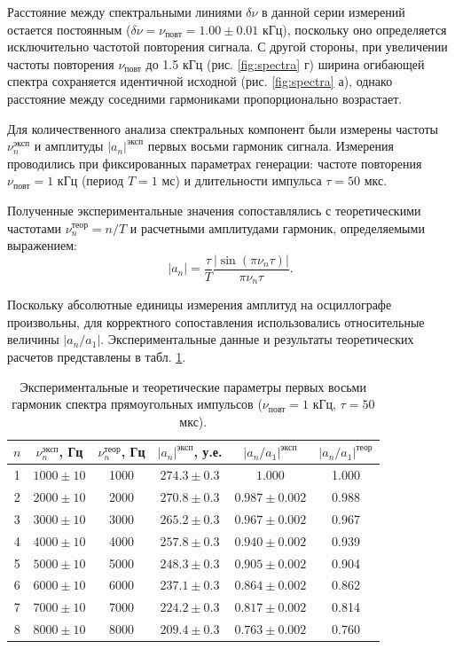 \documentclass[reprint, amsmath, amssymb, aps, pra, nofootinbib]{revtex4-2}
\begin{document}
Расстояние между спектральными линиями $\delta\nu$ в данной серии измерений остается постоянным ($\delta\nu = \nu_{\text{повт}} = 1.00 \pm 0.01$ кГц), поскольку оно определяется исключительно частотой повторения сигнала. С другой стороны, при увеличении частоты повторения $\nu_{\text{повт}}$ до 1.5 кГц (рис. \ref{fig:spectra} г) ширина огибающей спектра сохраняется идентичной исходной (рис. \ref{fig:spectra} а), однако расстояние между соседними гармониками пропорционально возрастает.

Для количественного анализа спектральных компонент были измерены частоты $\nu_n^{\text{эксп}}$ и амплитуды $|a_n|^{\text{эксп}}$ первых восьми гармоник сигнала. Измерения проводились при фиксированных параметрах генерации: частоте повторения $\nu_{\text{повт}} = 1$ кГц (период $T = 1$ мс) и длительности импульса $\tau = 50$ мкс.

Полученные экспериментальные значения сопоставлялись с теоретическими частотами $\nu_n^{\text{теор}} = n/T$ и расчетными амплитудами гармоник, определяемыми выражением:
\begin{equation}
    |a_n| = \frac{\tau}{T} \frac{|\sin(\pi \nu_n \tau)|}{\pi \nu_n \tau}.
\end{equation}

Поскольку абсолютные единицы измерения амплитуд на осциллографе произвольны, для корректного сопоставления использовались относительные величины $|a_n/a_1|$. Экспериментальные данные и результаты теоретических расчетов представлены в табл. \ref{tab:harmonics}. 

\begin{table}[ht!]
    \caption{Экспериментальные и теоретические параметры первых восьми гармоник спектра прямоугольных импульсов ($\nu_{\text{повт}} = 1$ кГц, $\tau = 50$ мкс).}
    \label{tab:harmonics}
    \centering
    \begin{ruledtabular}
    \begin{tabular}{cccccc}
        $n$ & $\nu_n^{\text{эксп}}$, Гц & $\nu_n^{\text{теор}}$, Гц & $|a_n|^{\text{эксп}}$, у.е. & $|a_n/a_1|^{\text{эксп}}$ & $|a_n/a_1|^{\text{теор}}$ \\
        \hline
        1 & $1000 \pm 10$ & 1000 & $274.3 \pm 0.3$ & $1.000$ & 1.000 \\
        2 & $2000 \pm 10$ & 2000 & $270.8 \pm 0.3$ & $0.987 \pm 0.002$ & 0.988 \\
        3 & $3000 \pm 10$ & 3000 & $265.2 \pm 0.3$ & $0.967 \pm 0.002$ & 0.967 \\
        4 & $4000 \pm 10$ & 4000 & $257.8 \pm 0.3$ & $0.940 \pm 0.002$ & 0.939 \\
        5 & $5000 \pm 10$ & 5000 & $248.3 \pm 0.3$ & $0.905 \pm 0.002$ & 0.904 \\
        6 & $6000 \pm 10$ & 6000 & $237.1 \pm 0.3$ & $0.864 \pm 0.002$ & 0.862 \\
        7 & $7000 \pm 10$ & 7000 & $224.2 \pm 0.3$ & $0.817 \pm 0.002$ & 0.814 \\
        8 & $8000 \pm 10$ & 8000 & $209.4 \pm 0.3$ & $0.763 \pm 0.002$ & 0.760 \\
    \end{tabular}
    \end{ruledtabular}
\end{table}
\end{document}
